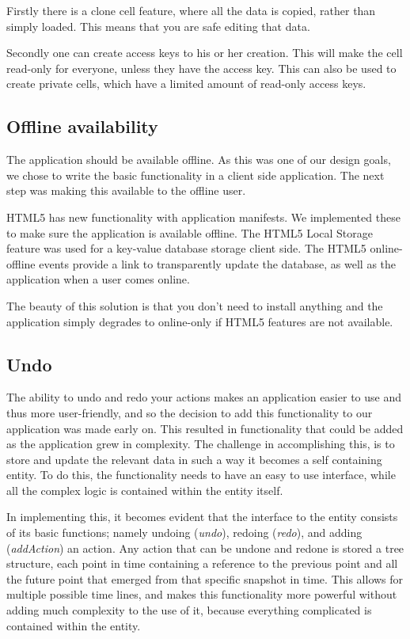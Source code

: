 \documentclass[10pt,a4paper]{report}
\begin{document}
			Firstly there is a clone cell feature, where all the data is copied, rather than simply loaded. This means that you are safe editing that data.
			
			Secondly one can create access keys to his or her creation. This will make the cell read-only for everyone, unless they have the access key. This can also be used to create private cells, which have a limited amount of read-only access keys.
		
		\subsection{Offline availability}
			The application should be available offline. As this was one of our design goals, we chose to write the basic functionality in a client side application. The next step was making this available to the offline user.
			
			HTML5 has new functionality with application manifests. We implemented these to make sure the application is available offline. The HTML5 Local Storage feature was used for a key-value database storage client side. The HTML5 online-offline events provide a link to transparently update the database, as well as the application when a user comes online.
			
			The beauty of this solution is that you don't need to install anything and the application simply degrades to online-only if HTML5 features are not available.
		
		\subsection{Undo}
			The ability to undo and redo your actions makes an application easier to use and thus more user-friendly, and so the decision to add this functionality to our application was made early on. This resulted in functionality that could be added as the application grew in complexity. The challenge in accomplishing this, is to store and update the relevant data in such a way it becomes a self containing entity. To do this, the functionality needs to have an easy to use interface, while all the complex logic is contained within the entity itself.
			
			In implementing this, it becomes evident that the interface to the entity consists of its basic functions; namely undoing (\emph{undo}), redoing (\emph{redo}), and adding (\emph{addAction}) an action. Any action that can be undone and redone is stored a tree structure, each point in time containing a reference to the previous point and all the future point that emerged from that specific snapshot in time. This allows for multiple possible time lines, and makes this functionality more powerful without adding much complexity to the use of it, because everything complicated is contained within the entity.
\end{document}
